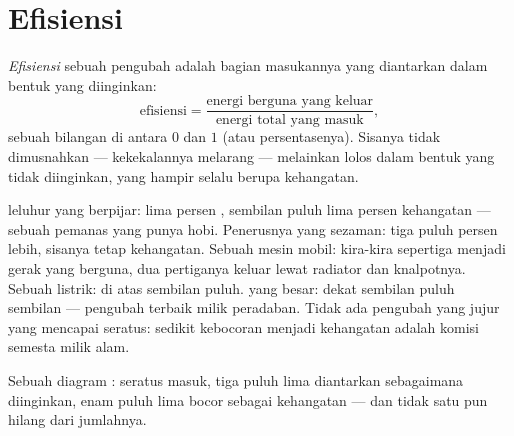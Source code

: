 \section{Efisiensi}

\begin{definition}[Efisiensi]\label{def:g9:energy-conversions:efficiency}
\emph{Efisiensi} sebuah pengubah adalah bagian 
masukannya yang diantarkan dalam bentuk yang diinginkan:
\[
\text{efisiensi} =
\frac{\text{energi berguna yang keluar}}{\text{energi total yang masuk}},
\]
sebuah bilangan di antara $0$ dan $1$ (atau persentasenya). Sisanya
tidak dimusnahkan --- kekekalannya melarang --- melainkan lolos dalam
bentuk yang tidak diinginkan, yang hampir selalu berupa kehangatan.
\end{definition}

\begin{example}[Rapor]\label{ex:g9:energy-conversions:reportcards}
 leluhur yang berpijar: lima persen , sembilan puluh lima
persen kehangatan --- sebuah pemanas yang punya hobi. Penerusnya yang
sezaman: tiga puluh persen lebih, sisanya tetap kehangatan. Sebuah
mesin mobil: kira-kira sepertiga menjadi gerak yang berguna, dua
pertiganya keluar lewat radiator dan knalpotnya. Sebuah  listrik:
di atas sembilan puluh.  yang besar: dekat sembilan puluh
sembilan --- pengubah terbaik milik peradaban. Tidak ada pengubah yang
jujur yang mencapai seratus: sedikit kebocoran menjadi kehangatan
adalah komisi semesta milik alam.
\end{example}

\begin{omfigure}

{\small Sebuah diagram : seratus  masuk, tiga puluh lima
diantarkan sebagaimana diinginkan, enam puluh lima bocor sebagai
kehangatan --- dan tidak satu  pun hilang dari jumlahnya.}
\end{omfigure}

